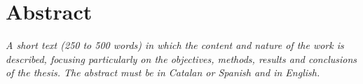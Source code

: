 \chapter*{Abstract}


\textit{A short text (250 to 500 words) in which the content and nature of the work is described, focusing particularly on the objectives, methods, results and conclusions of the thesis. The abstract must be in Catalan or Spanish and in English.}
